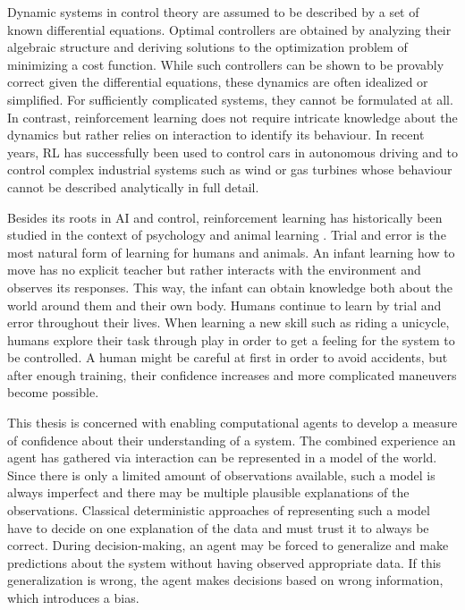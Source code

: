 Dynamic systems in control theory are assumed to be described by a set of known differential equations.
Optimal controllers are obtained by analyzing their algebraic structure and deriving solutions to the optimization problem of minimizing a cost function.
While such controllers can be shown to be provably correct given the differential equations, these dynamics are often idealized or simplified.
For sufficiently complicated systems, they cannot be formulated at all.
In contrast, reinforcement learning does not require intricate knowledge about the dynamics but rather relies on interaction to identify its behaviour.
In recent years, RL has successfully been used to control cars in autonomous driving \cite{kolter_probabilistic_2010} and to control complex industrial systems such as wind or gas turbines \cite{schaefer_neural_2007} whose behaviour cannot be described analytically in full detail.

Besides its roots in AI and control, reinforcement learning has historically been studied in the context of psychology and animal learning \cite{sutton_reinforcement_1998}.
Trial and error is the most natural form of learning for humans and animals.
An infant learning how to move has no explicit teacher but rather interacts with the environment and observes its responses.
This way, the infant can obtain knowledge both about the world around them and their own body.
Humans continue to learn by trial and error throughout their lives.
When learning a new skill such as riding a unicycle, humans explore their task through play in order to get a feeling for the system to be controlled.
A human might be careful at first in order to avoid accidents, but after enough training, their confidence increases and more complicated maneuvers become possible.

This thesis is concerned with enabling computational agents to develop a measure of confidence about their understanding of a system.
The combined experience an agent has gathered via interaction can be represented in a model of the world.
Since there is only a limited amount of observations available, such a model is always imperfect and there may be multiple plausible explanations of the observations.
Classical deterministic approaches of representing such a model have to decide on one explanation of the data and must trust it to always be correct.
During decision-making, an agent may be forced to generalize and make predictions about the system without having observed appropriate data.
If this generalization is wrong, the agent makes decisions based on wrong information, which introduces a bias.

